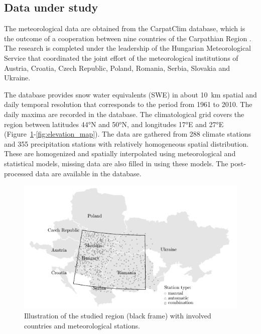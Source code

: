 \subsection{Data under study}
\label{sec:data_under_study}
The meteorological data are obtained from the CarpatClim database, which is the outcome of a cooperation between nine countries of the Carpathian Region \citep{Szalai2013}. The research is completed under the leadership of the Hungarian Meteorological Service that coordinated the joint effort of the meteorological institutions of Austria, Croatia, Czech Republic, Poland, Romania, Serbia, Slovakia and Ukraine.

The database provides snow water equivalents (SWE) in about 10~km  spatial and daily temporal resolution that corresponds to the period from 1961 to 2010. The daily maxima are recorded in the database. The climatological grid covers the region between latitudes 44°N and 50°N, and longitudes 17°E and 27°E (Figure~\ref{fig:carp_stations}-\ref{fig:elevation_map}). The data are gathered from 288 climate stations and 355 precipitation stations with relatively homogeneous spatial distribution. These are homogenized and spatially interpolated using meteorological and  statistical models, missing data are also filled in using these models. The post-processed data are available in the database. 



\begin{figure}[htbp!]
	\centering    
	\includegraphics[width=1\textwidth]{carp_map_stations_ai.pdf}
	\caption{Illustration of the studied region (black frame) with involved countries and meteorological stations.}
	\label{fig:carp_stations}
\end{figure}

